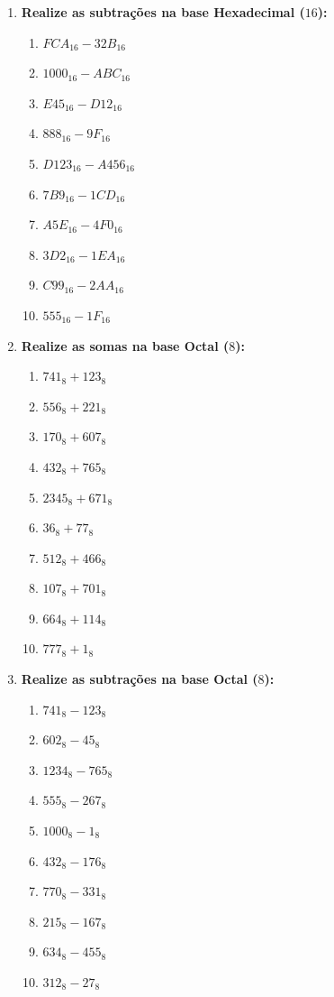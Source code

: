 \begin{enumerate}
    \item \textbf{Realize as subtrações na base Hexadecimal ($16$):}
          \begin{enumerate}
              \item $FCA_{16} - 32B_{16}$
              \item $1000_{16} - ABC_{16}$
              \item $E45_{16} - D12_{16}$
              \item $888_{16} - 9F_{16}$
              \item $D123_{16} - A456_{16}$
              \item $7B9_{16} - 1CD_{16}$
              \item $A5E_{16} - 4F0_{16}$
              \item $3D2_{16} - 1EA_{16}$
              \item $C99_{16} - 2AA_{16}$
              \item $555_{16} - 1F_{16}$
          \end{enumerate}

    \item \textbf{Realize as somas na base Octal ($8$):}
          \begin{enumerate}
              \item $741_{8} + 123_{8}$
              \item $556_{8} + 221_{8}$
              \item $170_{8} + 607_{8}$
              \item $432_{8} + 765_{8}$
              \item $2345_{8} + 671_{8}$
              \item $36_{8} + 77_{8}$
              \item $512_{8} + 466_{8}$
              \item $107_{8} + 701_{8}$
              \item $664_{8} + 114_{8}$
              \item $777_{8} + 1_{8}$
          \end{enumerate}

    \item \textbf{Realize as subtrações na base Octal ($8$):}
          \begin{enumerate}
              \item $741_{8} - 123_{8}$
              \item $602_{8} - 45_{8}$
              \item $1234_{8} - 765_{8}$
              \item $555_{8} - 267_{8}$
              \item $1000_{8} - 1_{8}$
              \item $432_{8} - 176_{8}$
              \item $770_{8} - 331_{8}$
              \item $215_{8} - 167_{8}$
              \item $634_{8} - 455_{8}$
              \item $312_{8} - 27_{8}$
          \end{enumerate}

\end{enumerate}